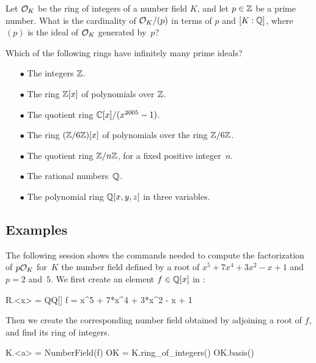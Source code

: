 \begin{exercise}
	Let $\mathcal{O}_K$ be the ring of integers of a number field $K$, and let $p\in\mathbb{Z}$
	be a prime number. What is the cardinality of $\mathcal{O}_K/(p)$ in terms of $p$
	and $[K:\mathbb{Q}]$, where $(p)$ is the ideal of $\mathcal{O}_K$ generated by~$p$?
\end{exercise}

\begin{exercise}
	Which of the following rings have infinitely many prime ideals?
	\begin{multicols}{2}
	\begin{enumerate}
		\item[$\bullet$]
		The integers $\mathbb{Z}$.
		\item[$\bullet$]
		The ring $\mathbb{Z}[x]$ of polynomials over $\mathbb{Z}$.
		\item[$\bullet$]
		The quotient ring $\mathbb{C}[x]/(x^{2005}-1)$.
		\item[$\bullet$]
		The ring $(\mathbb{Z}/6\mathbb{Z})[x]$ of polynomials over the ring $\mathbb{Z}/6\mathbb{Z}$.
		\item[$\bullet$]
		The quotient ring $\mathbb{Z}/n\mathbb{Z}$, for a fixed positive integer~$n$.
		\item[$\bullet$]
		The rational numbers~$\mathbb{Q}$.
		\item[$\bullet$]
		The polynomial ring $\mathbb{Q}[x,y,z]$ in three variables.
	\end{enumerate}
	\end{multicols}
\end{exercise}

\subsection{Examples}

The following \sage session shows the commands needed to compute
the factorization of $p\mathcal{O}_K$ for~$K$ the number field defined by
a root of $x^5 + 7x^4 + 3x^2 - x + 1$ and $p = 2$ and~$5$. We first
create an element $f\in \mathbb{Q}[x]$ in \sage:
\begin{sagecode}
\begin{sagecell}
R.<x> = QQ[]
f = x^5 + 7*x^4 + 3*x^2 - x + 1
\end{sagecell}
\end{sagecode} %

\noindent
Then we create the corresponding number field obtained
by adjoining a root of $f$, and find its ring of integers.
\begin{sagecode}
\begin{sagecell}
K.<a> = NumberField(f)
OK = K.ring_of_integers()
OK.basis()
\end{sagecell}
\begin{sageout}
[1, a, a^2, a^3, a^4]
\end{sageout}
\end{sagecode} %

